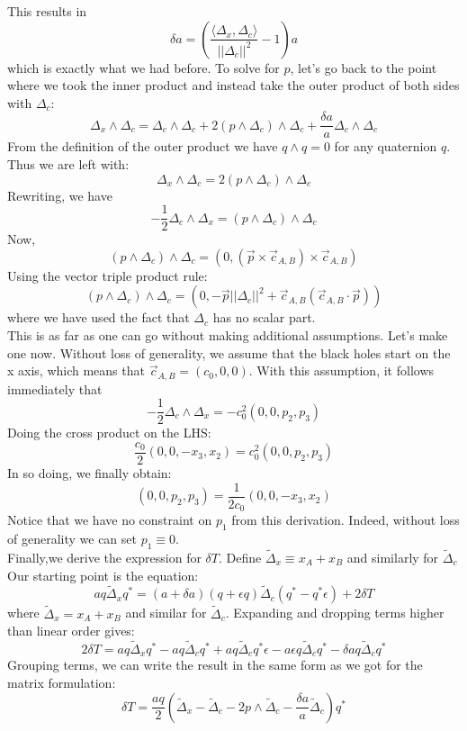\documentclass[aps, prd, amsmath, floats, floatfix, twocolumn,superscriptaddress, nofootinbib, showpacs]{revtex4-1}
\theoremstyle{plain}
\theoremstyle{definition}
\begin{document}
This results in
\[\delta a  =\left( \frac{\langle \Delta_{x},\Delta_{c}\rangle}{||\Delta_{c}||^{2}}-1\right)a\]
which is exactly what we had before.
To solve for $p$, let's go back to the point where we took the inner product and instead take the outer product of both sides with
$\Delta_{c}$:
\[\Delta_{x}\wedge \Delta_{c}=\Delta_{c}\wedge \Delta_{c}+2(p\wedge \Delta_{c})\wedge \Delta_{c} + \frac{\delta a}{a}\Delta_{c}\wedge \Delta_{c}\]
From the definition of the outer product we have $q\wedge q =0$ for any quaternion $q$. Thus we are left with:
\[\Delta_{x}\wedge \Delta_{c}=2(p\wedge \Delta_{c})\wedge \Delta_{c} \]
Rewriting, we have
\[-\frac{1}{2}\Delta_{c}\wedge \Delta_{x}=(p\wedge \Delta_{c})\wedge \Delta_{c}\]
Now,
\[(p\wedge \Delta_{c})\wedge \Delta_{c} =(0,(\vec{p}\times\vec{c}_{A,B})\times \vec{c}_{A,B})\]
Using the vector triple product rule:
\[(p\wedge \Delta_{c})\wedge \Delta_{c} =(0,-\vec{p}||\Delta_{c}||^{2}+\vec{c}_{A,B}(\vec{c}_{A,B}\cdot\vec{p}))\]
where we have used the fact that $\Delta_{c}$ has no scalar part. \\ 

This is as far as one can go without making additional assumptions. Let's make one now. Without
loss of generality, we assume that the black holes start on the x axis, which means
that $\vec{c}_{A,B}=(c_0,0,0)$. With this assumption, it follows immediately that
\[-\frac{1}{2}\Delta_{c}\wedge \Delta_{x}=-c^{2}_{0}(0,0,p_{2},p_{3})\]
Doing the cross product on the LHS:
\[\frac{c_{0}}{2}(0,0,-x_{3},x_{2})=c^{2}_{0}(0,0,p_{2},p_{3})\]
In so doing, we finally obtain:
\[(0,0,p_{2},p_{3})=\frac{1}{2c_0}(0,0,-x_{3},x_{2})\]
Notice that we have no constraint on $p_{1}$ from this derivation. Indeed, without loss of generality we can set $p_{1}\equiv 0$. \\

Finally,we derive the expression for $\delta T$. Define $\tilde{\Delta}_{x} \equiv x_{A}+x_{B}$ and similarly for $\tilde{\Delta}_{c}$ Our starting point is the equation:
\[aq\tilde{\Delta}_{x}q^{*}=(a+\delta a)(q+\epsilon q)\tilde{\Delta}_{c}(q^{*}-q^{*}\epsilon)+2\delta T\]
where $\tilde{\Delta}_{x}=x_{A}+x_{B}$ and similar for $\tilde{\Delta}_{c}$.
Expanding and dropping terms higher than linear order gives:
\[2\delta T = aq\tilde{\Delta}_{x}q^{*}-aq\tilde{\Delta}_{c}q^{*}+aq\tilde{\Delta}_{c}q^{*}\epsilon -a\epsilon q \tilde{\Delta}_{c}q^{*}-\delta a q \tilde{\Delta}_{c}q^{*}\]
Grouping terms, we can write the result in the same form as we got for the matrix
formulation:
\[\delta T = \frac{aq}{2}\left(\tilde{\Delta}_{x}-\tilde{\Delta}_{c}-2p\wedge \tilde{\Delta}_{c}-\frac{\delta a}{a}\tilde{\Delta}_{c}\right)q^{*}\]





\end{document}
